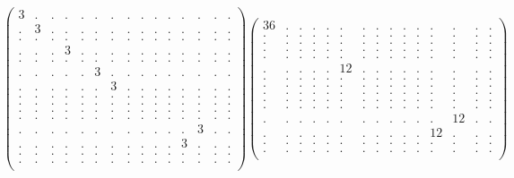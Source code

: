 \documentclass[12pt,a4paper]{amsart}
\begin{document}
\begin{align*}
\left(\begin{array}{rrrrrrrrrrrrrrr}%
3&.&.&.&.&.&.&.&.&.&.&.&.&.&.\\%
.&3&.&.&.&.&.&.&.&.&.&.&.&.&.\\%
.&.&.&.&.&.&.&.&.&.&.&.&.&.&.\\%
.&.&.&3&.&.&.&.&.&.&.&.&.&.&.\\%
.&.&.&.&.&.&.&.&.&.&.&.&.&.&.\\%
.&.&.&.&.&3&.&.&.&.&.&.&.&.&.\\%
.&.&.&.&.&.&3&.&.&.&.&.&.&.&.\\%
.&.&.&.&.&.&.&.&.&.&.&.&.&.&.\\%
.&.&.&.&.&.&.&.&.&.&.&.&.&.&.\\%
.&.&.&.&.&.&.&.&.&.&.&.&.&.&.\\%
.&.&.&.&.&.&.&.&.&.&.&.&.&.&.\\%
.&.&.&.&.&.&.&.&.&.&.&.&3&.&.\\%
.&.&.&.&.&.&.&.&.&.&.&3&.&.&.\\%
.&.&.&.&.&.&.&.&.&.&.&.&.&.&.\\%
.&.&.&.&.&.&.&.&.&.&.&.&.&.&.\\%
\end{array}\right)%
\left(\begin{array}{rrrrrrrrrrrrrrr}%
36&.&.&.&.&.&.&.&.&.&.&.&.&.&.\\%
.&.&.&.&.&.&.&.&.&.&.&.&.&.&.\\%
.&.&.&.&.&.&.&.&.&.&.&.&.&.&.\\%
.&.&.&.&.&.&.&.&.&.&.&.&.&.&.\\%
.&.&.&.&.&.&.&.&.&.&.&.&.&.&.\\%
.&.&.&.&.&12&.&.&.&.&.&.&.&.&.\\%
.&.&.&.&.&.&.&.&.&.&.&.&.&.&.\\%
.&.&.&.&.&.&.&.&.&.&.&.&.&.&.\\%
.&.&.&.&.&.&.&.&.&.&.&.&.&.&.\\%
.&.&.&.&.&.&.&.&.&.&.&.&.&.&.\\%
.&.&.&.&.&.&.&.&.&.&.&.&.&.&.\\%
.&.&.&.&.&.&.&.&.&.&.&.&12&.&.\\%
.&.&.&.&.&.&.&.&.&.&.&12&.&.&.\\%
.&.&.&.&.&.&.&.&.&.&.&.&.&.&.\\%
.&.&.&.&.&.&.&.&.&.&.&.&.&.&.\\%
\end{array}\right)%
\end{align*}
\end{document}
